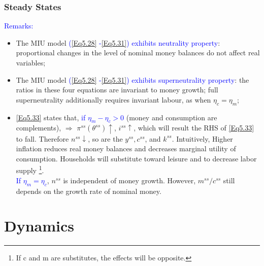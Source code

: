 \documentclass[handout]{beamer}
\begin{document}
\begin{frame}
\frametitle{Steady States}

\textcolor{blue}{Remarks:}

\begin{itemize}
\item {\small{The MIU model {\textcolor{blue}{(\eqref{Eq5.28} -\eqref{Eq5.31}) exhibits neutrality property}}: proportional
changes in the level of nominal money balances do not affect real
variables;}}
\item {\small{The MIU model {\textcolor{blue}{(\eqref{Eq5.28} -\eqref{Eq5.31}) exhibits superneutrality property}}: the ratios in these four equations are invariant to money growth; full superneutrality additionally requires invariant labour, as when $\eta_c=\eta_m$;}}
\item {\small{\eqref{Eq5.33} states that, {\textcolor{blue}{if $\eta_{m}-\eta_{c}>0$}} (money and consumption are complements), $\Rightarrow$
$\pi^{ss}(\theta^{ss}) \uparrow$, $i^{ss} \uparrow$, which will
result the RHS of \eqref{Eq5.33} to fall. Therefore
$n^{ss}\downarrow$, so are the $y^{ss}, c^{ss}$, and $k^{ss}$.
Intuitively, Higher inflation reduces real money balances and
decreases marginal utility of consumption. Households will
substitute toward leisure and to decrease labor supply \footnote{If
c and m are substitutes, the effects will be opposite.}.\\

{\textcolor{blue}{If $\eta_{m}=\eta_{c}$}}, $n^{ss}$ is independent of money growth.
However, $m^{ss}/c^{ss}$ still depends on the growth rate of nominal
money.}}
\end{itemize}

\end{frame}


\section{Dynamics}
\end{document}
